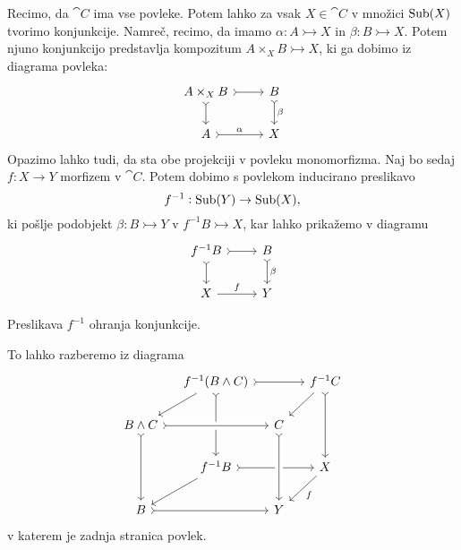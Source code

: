 \documentclass[../kategoricna_logika.tex]{subfiles}
\begin{document}
Recimo, da $\cat{C}$ ima vse povleke. 
Potem lahko za vsak $X \in \cat{C}$ v množici $\operatorname{Sub}(X)$ tvorimo konjunkcije.
Namreč, recimo, da imamo $\alpha : A \rightarrowtail X$ in $\beta : B \rightarrowtail X$.
Potem njuno konjunkcijo predstavlja kompozitum $A \times_X B \rightarrowtail X$,
ki ga dobimo iz diagrama povleka:
\begin{equation*}
    \begin{tikzcd}
        A \times_X B \ar[r, tail] \ar[d, tail] & B \ar[d, tail, "\beta"] \\
        A \ar[r, tail, "\alpha"] & X
    \end{tikzcd}
\end{equation*}
Opazimo lahko tudi, da sta obe projekciji v povleku monomorfizma.
Naj bo sedaj $f : X \to Y$ morfizem v $\cat{C}$.
Potem dobimo s povlekom inducirano preslikavo
$$f^{-1} : \operatorname{Sub}(Y) \to \operatorname{Sub}(X),$$
ki pošlje podobjekt $\beta : B \rightarrowtail Y$ v $f^{-1}B \rightarrowtail X$,
kar lahko prikažemo v diagramu
\begin{equation*}
    \begin{tikzcd}
        f^{-1}B \ar[r, tail] \ar[d, tail] & B \ar[d, tail, "\beta"] \\
        X \ar[r, "f"] & Y
    \end{tikzcd}
\end{equation*}
\begin{lema}
  Preslikava $f^{-1}$ ohranja konjunkcije.
\end{lema}
\begin{dokaz}
  To lahko razberemo iz diagrama
  \begin{equation*}
  \begin{tikzcd}[column sep=small, row sep=normal]
    & f^{-1}(B \land C) \ar[dl] \ar[dd, tail] \ar[rr, tail] & & f^{-1}C \ar[dl] \ar[dd, tail] \\
    B \land C \ar[dd, tail] \ar[rr, crossing over, tail] & & C  & \\
    & f^{-1}B \ar[dl] \ar[rr, tail] & & X \ar[dl, "f"] \\
    B \ar[rr, tail] & & Y \ar[from=uu, crossing over, tail] & 
  \end{tikzcd}
  \end{equation*}
  v katerem je zadnja stranica povlek.
\end{dokaz}
\end{document}
